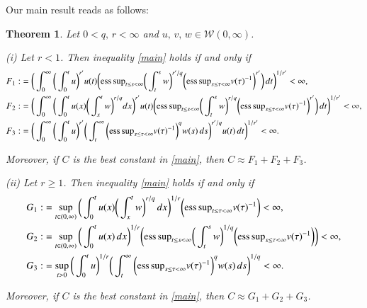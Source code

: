 \documentclass[12pt]{amsart}
\theoremstyle{plain}
\newtheorem{thm}{Theorem}[section]
\theoremstyle{definition}
\numberwithin{thm}{section}
\numberwithin{equation}{section}
\begin{document}
Our main result reads as follows:
\begin{thm}\label{main1}
	Let $0 < q,\, r < \infty$ and  $u,\,v,\,w \in {\mathcal W}{(0,\infty)}$.
	
	{\rm (i)} Let $r < 1$. Then inequality \eqref{main} holds if and only if
	\begin{align*}
		F_1 : & = \bigg( \int_0^{\infty}  \bigg( \int_0^t u \bigg)^{r'}  u(t) \bigg( {\operatornamewithlimits{ess\,sup}}_{t \le s < \infty} \bigg(
		\int_t^s w \bigg)^{r' / q} \bigg({\operatornamewithlimits{ess\,sup}}_{s \le \tau < \infty }v(\tau)^{-1}\bigg)^{r'} \bigg) \,dt\bigg)^{1/r'} < \infty, \\
		F_2 : & = \bigg( \int_0^{\infty}  \bigg( \int_0^t u(x) \bigg( \int_x^t w \bigg)^{r / q} dx \bigg)^{r'} u(t) \bigg( {\operatornamewithlimits{ess\,sup}}_{t \le s < \infty} \bigg( \int_t^s w \bigg)^{r/q} \bigg({\operatornamewithlimits{ess\,sup}}_{s \le \tau < \infty }v(\tau)^{-1}\bigg)^{r'} \bigg) \,dt\bigg)^{1/r'}  < \infty, \\
		F_3 : & = \bigg( \int_0^{\infty} \bigg( \int_0^t u\bigg)^{r'} \bigg( \int_t^{\infty} \bigg({\operatornamewithlimits{ess\,sup}}_{s \le \tau < \infty} v(\tau)^{-1}\bigg)^{q} w(s)\,ds \bigg)^{ r' / q}u(t)\,dt \bigg)^{1/r'} < \infty.
	\end{align*}	
	
	Moreover, if $C$ is the best constant in \eqref{main}, then $C \approx F_1 + F_2 + F_3$.
	
	{\rm (ii)} Let $r \ge 1$. Then inequality \eqref{main} holds if and only if
	\begin{align*}
		G_1 : & = \sup_{t \in (0,\infty)} \bigg( \int_0^t   u(x) \bigg( \int_x^t w \bigg)^{r / q}  \,dx \bigg)^{1 / r}  \bigg({\operatornamewithlimits{ess\,sup}}_{t \le \tau < \infty }v(\tau)^{-1}\bigg) < \infty, \\
		G_2 : & = \sup_{t \in (0,\infty)}  \bigg( \int_0^t u(x) \,dx \bigg)^{1/r}  \bigg( {\operatornamewithlimits{ess\,sup}}_{t \le s < \infty} \bigg( \int_t^s w \bigg)^{1/q} \bigg({\operatornamewithlimits{ess\,sup}}_{s \le \tau < \infty }v(\tau)^{-1}\bigg) \bigg) < \infty, \\
		G_3 : & = \sup_{t > 0} \bigg( \int_0^t u \bigg)^{1 / r} \bigg( \int_t^{\infty} \bigg({\operatornamewithlimits{ess\,sup}}_{s \le \tau < \infty }v(\tau)^{-1}\bigg)^{q} w(s)\,ds \bigg)^{ 1 / q} < \infty.	
	\end{align*}
	
	Moreover, if $C$ is the best constant in \eqref{main}, then $C \approx G_1 + G_2 + G_3$.
\end{thm}
\end{document}
